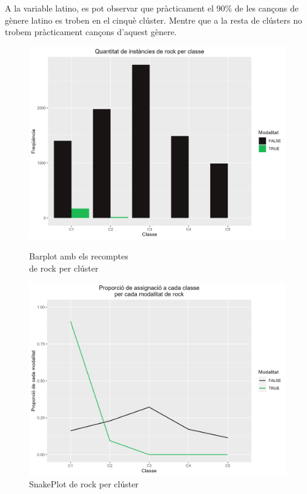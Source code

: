 \documentclass{article}
\begin{document}
A la variable latino, es pot observar que pràcticament el 90\% de les cançons de gènere latino es troben en el cinquè clúster. Mentre que a la resta de clústers no trobem pràcticament cançons d'aquest gènere.

\begin{figure}[H]
\centering
    \begin{minipage}{.49\textwidth}
        \centering
        \includegraphics[width=0.95\linewidth]{Images/5_Profiling/categoriques/cat/Cat_BarPlot_rock.png}
        \caption{Barplot amb els recomptes \\ de rock per clúster}
        \label{fig:Cat_BarPlot_rock}
    \end{minipage}%
    \begin{minipage}{.49\textwidth}
        \centering
        \includegraphics[width=0.95\linewidth]{Images/5_Profiling/categoriques/cat/Cat_SnakePlot_rock.png}
        \caption{SnakePlot de rock per clúster}
        \label{fig:Cat_SnakePlot_rock}
    \end{minipage}%
\end{figure}
\end{document}
